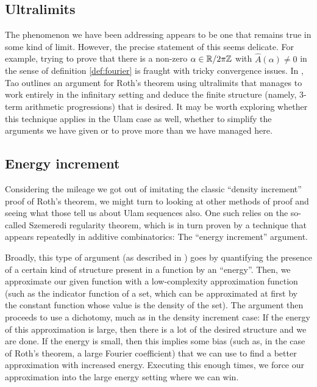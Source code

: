 \documentclass{report}
\theoremstyle{remark}
\numberwithin{equation}{section}
\begin{document}
\subsection{Ultralimits}

The phenomenon we have been addressing appears to be one that remains
true in some kind of limit.  However, the precise statement of this
seems delicate.  For example, trying to prove that there is a non-zero
$\alpha\in\mathbb{R}/2\pi\mathbb{Z}$ with $\widehat{A}(\alpha) \neq 0$ in the sense of
definition \ref{def:fourier} is fraught with tricky convergence
issues.  In \cite{tao:ams2012}, Tao outlines an argument for Roth's
theorem using ultralimits that manages to work entirely in the
infinitary setting and deduce the finite structure (namely, 3-term
arithmetic progressions) that is desired.  It may be worth exploring
whether this technique applies in the Ulam case as well, whether to
simplify the arguments we have given or to prove more than we have
managed here.

\subsection{Energy increment}

Considering the mileage we got out of imitating the classic ``density
increment'' proof of Roth's theorem, we might turn to looking at other
methods of proof and seeing what those tell us about Ulam sequences
also.  One such relies on the so-called Szemeredi regularity theorem,
which is in turn proven by a technique that appears repeatedly in
additive combinatorics: The ``energy increment'' argument.  

Broadly, this type of argument (as described in \cite{tao:cup2006})
goes by quantifying the presence of a certain kind of structure
present in a function by an ``energy''.  Then, we approximate our
given function with a low-complexity approximation function (such as
the indicator function of a set, which can be approximated at first by
the constant function whose value is the density of the set).  The
argument then proceeds to use a dichotomy, much as in the density
increment case: If the energy of this approximation is large, then
there is a lot of the desired structure and we are done.  If the
energy is small, then this implies some bias (such as, in the case of
Roth's theorem, a large Fourier coefficient) that we can use to find a
better approximation with increased energy.  Executing this enough
times, we force our approximation into the large energy setting where
we can win.
\end{document}
